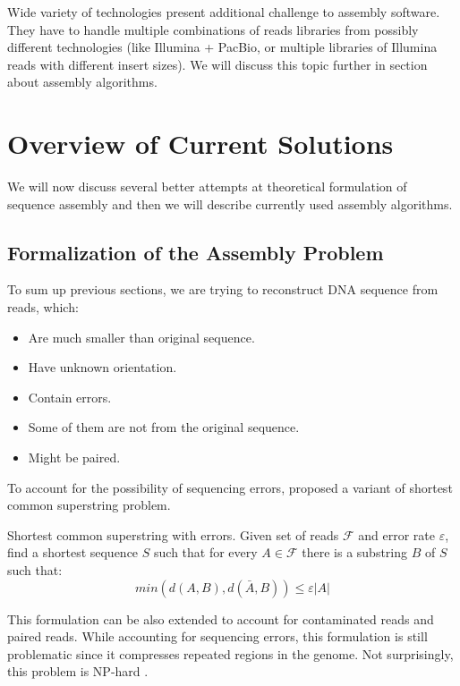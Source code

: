 Wide variety of technologies present additional challenge to assembly software.
They have to handle multiple combinations of reads libraries from possibly
different technologies (like Illumina + PacBio,
or multiple libraries of Illumina reads with different insert sizes).
We will discuss this topic further in section about assembly algorithms. 

\section{Overview of Current Solutions}

We will now discuss several better attempts at theoretical
formulation of sequence assembly and then we will describe currently
used assembly algorithms.

\subsection{Formalization of the Assembly Problem}

To sum up previous sections, we are trying to reconstruct DNA sequence from reads,
which:
\begin{itemize}
\itemsep-0pt
\item Are much smaller than original sequence.
\item Have unknown orientation.
\item Contain errors.
\item Some of them are not from the original sequence.
\item Might be paired. 
\end{itemize}

\bigskip

To account for the possibility of sequencing errors, 
\citet{kececioglu1995combinatorial}
proposed a variant of shortest common superstring problem. 

\begin{definition}{Shortest common superstring with errors.}
Given set of reads $\mathcal{F}$ and error rate $\varepsilon$, find
a shortest sequence $S$ such that for every $A \in \mathcal{F}$ there is a substring
$B$ of $S$ such that:
$$min(d(A,B), d(\bar{A}, B)) \leq \varepsilon |A|$$
\end{definition}

This formulation can be also extended to account for contaminated reads and paired reads.
While accounting for sequencing errors, this formulation is still problematic
since it compresses repeated regions in the genome.
Not surprisingly, this problem is NP-hard \citep{kececioglu1991exact}.

